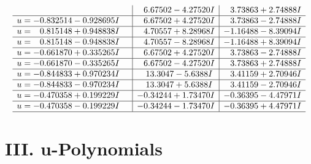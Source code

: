\documentclass[1p]{elsarticle_modified}
\theoremstyle{definition}
\begin{document}
$$\begin{array}{c|c|c}
 & \phantom{-}6.67502 - 4.27520 I & \phantom{-}3.73863 + 2.74888 I \\ \hline\begin{aligned}
u &= -0.832514 - 0.928695 I\end{aligned}
 & \phantom{-}6.67502 + 4.27520 I & \phantom{-}3.73863 - 2.74888 I \\ \hline\begin{aligned}
u &= \phantom{-}0.815148 + 0.948838 I\end{aligned}
 & \phantom{-}4.70557 + 8.28968 I & -1.16488 - 8.39094 I \\ \hline\begin{aligned}
u &= \phantom{-}0.815148 - 0.948838 I\end{aligned}
 & \phantom{-}4.70557 - 8.28968 I & -1.16488 + 8.39094 I \\ \hline\begin{aligned}
u &= -0.661870 + 0.335265 I\end{aligned}
 & \phantom{-}6.67502 + 4.27520 I & \phantom{-}3.73863 - 2.74888 I \\ \hline\begin{aligned}
u &= -0.661870 - 0.335265 I\end{aligned}
 & \phantom{-}6.67502 - 4.27520 I & \phantom{-}3.73863 + 2.74888 I \\ \hline\begin{aligned}
u &= -0.844833 + 0.970234 I\end{aligned}
 & \phantom{-}13.3047 - 5.6388 I & \phantom{-}3.41159 + 2.70946 I \\ \hline\begin{aligned}
u &= -0.844833 - 0.970234 I\end{aligned}
 & \phantom{-}13.3047 + 5.6388 I & \phantom{-}3.41159 - 2.70946 I \\ \hline\begin{aligned}
u &= -0.470358 + 0.199229 I\end{aligned}
 & -0.34244 + 1.73470 I & -0.36395 - 4.47971 I \\ \hline\begin{aligned}
u &= -0.470358 - 0.199229 I\end{aligned}
 & -0.34244 - 1.73470 I & -0.36395 + 4.47971 I\\
 \hline 
 \end{array}$$\newpage
\newpage\renewcommand{\arraystretch}{1}
\centering \section*{ III. u-Polynomials}
\end{document}
